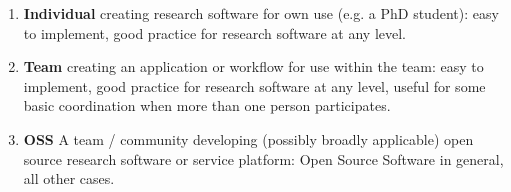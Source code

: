 \documentclass[a4paper]{article}
\begin{document}
\begin{enumerate}
    \item \textbf{Individual} creating research software for own use (e.g. a PhD student): easy to implement, good practice for research software at any level.
    \item \textbf{Team} creating an application or workflow for use within the team: easy to implement, good practice for research software at any level, useful
    for some basic coordination when more than one person participates.
    \item \textbf{OSS} A team / community developing (possibly broadly applicable) open source research software or service platform:
    Open Source Software in general, all other cases.
\end{enumerate}



\newpage
\printbibliography
\end{document}
